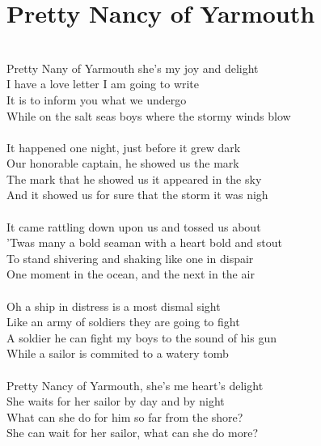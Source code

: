 \documentclass[letterpaper,14pt]{extarticle}
\begin{document}
\section{Pretty Nancy of Yarmouth}
\noindent
\\Pretty Nany of Yarmouth she's my joy and delight
\\I have a love letter I am going to write
\\It is to inform you what we undergo
\\While on the salt seas boys where the stormy winds blow
\\
\\It happened one night, just before it grew dark
\\Our honorable captain, he showed us the mark
\\The mark that he showed us it appeared in the sky
\\And it showed us for sure that the storm it was nigh
\\
\\It came rattling down upon us and tossed us about
\\'Twas many a bold seaman with a heart bold and stout
\\To stand shivering and shaking like one in dispair
\\One moment in the ocean, and the next in the air
\\
\\Oh a ship in distress is a most dismal sight
\\Like an army of soldiers they are going to fight
\\A soldier he can fight my boys to the sound of his gun
\\While a sailor is commited to a watery tomb
\\
\\Pretty Nancy of Yarmouth, she's me heart's delight
\\She waits for her sailor by day and by night
\\What can she do for him so far from the shore?
\\She can wait for her sailor, what can she do more?
\end{document}

